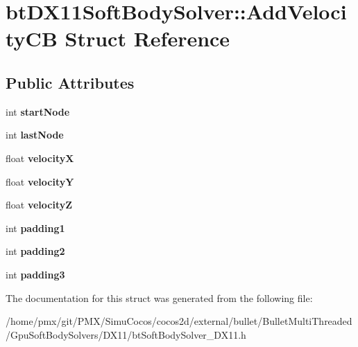 \hypertarget{structbtDX11SoftBodySolver_1_1AddVelocityCB}{}\section{bt\+D\+X11\+Soft\+Body\+Solver\+:\+:Add\+Velocity\+CB Struct Reference}
\label{structbtDX11SoftBodySolver_1_1AddVelocityCB}
\subsection*{Public Attributes}
\begin{DoxyCompactItemize}
\item 
\mbox{\label{structbtDX11SoftBodySolver_1_1AddVelocityCB_ad2682f9fbf30797b40793757174048f6}} 
int {\bfseries start\+Node}
\item 
\mbox{\label{structbtDX11SoftBodySolver_1_1AddVelocityCB_a9d9cd491315336fa7bf928e34cbc08c0}} 
int {\bfseries last\+Node}
\item 
\mbox{\label{structbtDX11SoftBodySolver_1_1AddVelocityCB_aa984e2b59be1d05717c8b7330b616db3}} 
float {\bfseries velocityX}
\item 
\mbox{\label{structbtDX11SoftBodySolver_1_1AddVelocityCB_ad3d0c9168747627365da91560035f643}} 
float {\bfseries velocityY}
\item 
\mbox{\label{structbtDX11SoftBodySolver_1_1AddVelocityCB_a11fa690326828ae037fe253cd26a2aa3}} 
float {\bfseries velocityZ}
\item 
\mbox{\label{structbtDX11SoftBodySolver_1_1AddVelocityCB_a95978e53ee0eeea3085dad395b006167}} 
int {\bfseries padding1}
\item 
\mbox{\label{structbtDX11SoftBodySolver_1_1AddVelocityCB_ad5718d6bb92d08310ac268286ad1794a}} 
int {\bfseries padding2}
\item 
\mbox{\label{structbtDX11SoftBodySolver_1_1AddVelocityCB_a7816f132f201fb264c5a0de26b4e7d4c}} 
int {\bfseries padding3}
\end{DoxyCompactItemize}


The documentation for this struct was generated from the following file\+:\begin{DoxyCompactItemize}
\item 
/home/pmx/git/\+P\+M\+X/\+Simu\+Cocos/cocos2d/external/bullet/\+Bullet\+Multi\+Threaded/\+Gpu\+Soft\+Body\+Solvers/\+D\+X11/bt\+Soft\+Body\+Solver\+\_\+\+D\+X11.\+h\end{DoxyCompactItemize}
